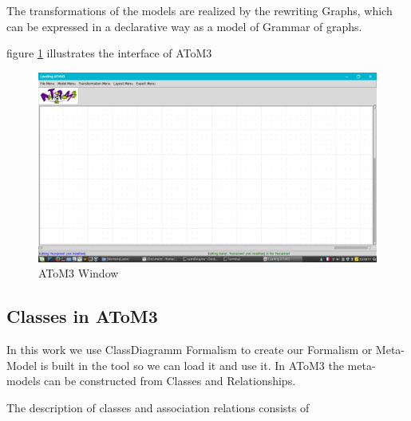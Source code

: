  The transformations of the models are realized by the rewriting
Graphs, which can be expressed in a declarative way as a model of
Grammar of graphs\cite{ch3-meta2}.

 figure \ref{fig:AToM3 Window} illustrates the interface of AToM3 

\begin{figure}[th]
	\centering
		\includegraphics[scale=0.33]{ch3/img/atom3}
	\caption{\label{fig:AToM3 Window}AToM3 Window}
\end{figure} 
\vspace{1cm}
\subsection{Classes in AToM3}
In this work we use ClassDiagramm Formalism to create  our Formalism 
or Meta-Model is built in the tool so we can load it and use  it\cite{ch3-meta2}.
In AToM3 the meta-models can be constructed from Classes and
Relationships.

The description of classes and association relations consists of

